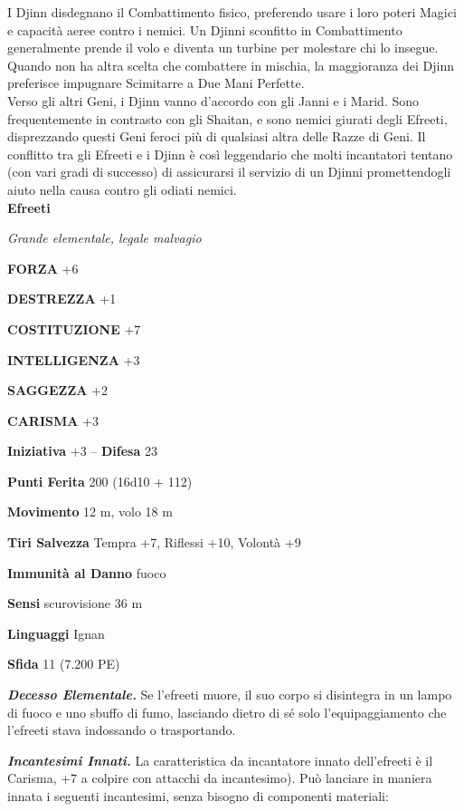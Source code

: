 \begin{multicols}{2}
I Djinn disdegnano il Combattimento fisico, preferendo usare i loro poteri Magici e capacità aeree contro i nemici. Un Djinni sconfitto in Combattimento generalmente prende il volo e diventa un turbine per molestare chi lo insegue. Quando non ha altra scelta che combattere in mischia, la maggioranza dei Djinn preferisce impugnare Scimitarre a Due Mani Perfette.\\

Verso gli altri Geni, i Djinn vanno d'accordo con gli Janni e i Marid. Sono frequentemente in contrasto con gli Shaitan, e sono nemici giurati degli Efreeti, disprezzando questi Geni feroci più di qualsiasi altra delle Razze di Geni. Il conflitto tra gli Efreeti e i Djinn è così leggendario che molti incantatori tentano (con vari gradi di successo) di assicurarsi il servizio di un Djinni promettendogli aiuto nella causa contro gli odiati nemici.\\


\medskip{}\textbf{Efreeti}

\emph{Grande elementale, legale malvagio}

\textbf{FORZA} +6

\textbf{DESTREZZA} +1

\textbf{COSTITUZIONE} +7

\textbf{INTELLIGENZA} +3

\textbf{SAGGEZZA} +2

\textbf{CARISMA} +3

\textbf{Iniziativa} +3 -- \textbf{Difesa} 23

\textbf{Punti Ferita} 200 (16d10 + 112)

\textbf{Movimento} 12 m, volo 18 m

\textbf{Tiri Salvezza} Tempra +7, Riflessi +10, Volontà +9

\textbf{Immunità al Danno} fuoco

\textbf{Sensi} scurovisione 36 m

\textbf{Linguaggi} Ignan

\textbf{Sfida} 11 (7.200 PE)

\emph{\textbf{Decesso Elementale.}} Se l'efreeti muore, il suo corpo si disintegra in un lampo di fuoco e uno sbuffo di fumo, lasciando dietro di sé solo l'equipaggiamento che l'efreeti stava indossando o trasportando.

\emph{\textbf{Incantesimi Innati.}} La caratteristica da incantatore innato dell'efreeti è il Carisma, +7 a colpire con attacchi da incantesimo). Può lanciare in maniera innata i seguenti incantesimi, senza bisogno di componenti materiali: 


\end{multicols}
